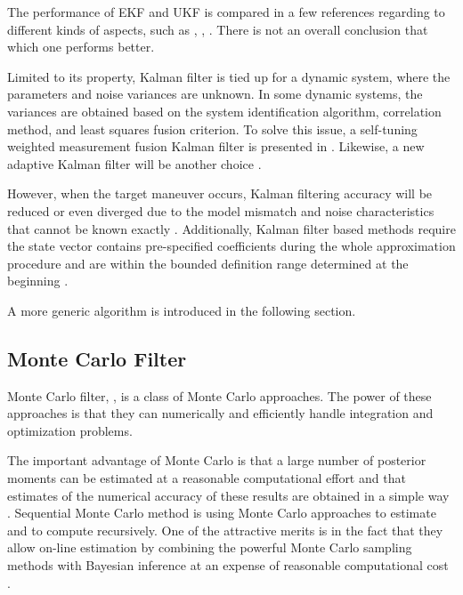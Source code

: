 The performance of EKF and UKF is compared in a few references regarding to different kinds of aspects, such as \cite{chandrasekar2007comparison}, \cite{laviola2003comparison}, \cite{st2004comparison}. There is not an overall conclusion that which one performs better. 


Limited to its property, Kalman filter is tied up for a dynamic system, where the parameters and noise variances are unknown. In some dynamic systems, the variances are obtained based on the system identification algorithm, correlation method, and least squares fusion criterion. To solve this issue, a self-tuning weighted measurement fusion Kalman filter is presented in \cite{ran2010self}. Likewise, a new adaptive Kalman filter will be another choice \cite{oussalah2001adaptive}. 


However, when the target maneuver occurs, Kalman filtering accuracy will be reduced or even diverged due to the model mismatch and noise characteristics that cannot be known exactly \cite{liu2014filtering}. Additionally, Kalman filter based methods require the state vector contains pre-specified coefficients during the whole approximation procedure and are within the bounded definition range determined at the beginning \cite{jauch2017recursive}. 

A more generic algorithm is introduced in the following section. 


\subsection*{Monte Carlo Filter}

Monte Carlo filter, \cite{chen2003bayesian},  is a class of Monte Carlo approaches. The power of these approaches is that they can numerically and efficiently handle integration and optimization problems. 

The important advantage of Monte Carlo is that a large number of posterior moments can be estimated at a reasonable computational effort and that estimates of the numerical accuracy of these results are obtained in a simple way \cite{kloek1978bayesian}. Sequential Monte Carlo method is using Monte Carlo approaches to estimate and to compute recursively. One of the attractive merits is in the fact that they allow on-line estimation by combining the powerful Monte Carlo sampling methods with Bayesian inference at an expense of reasonable computational cost \cite{chen2003bayesian}. 

